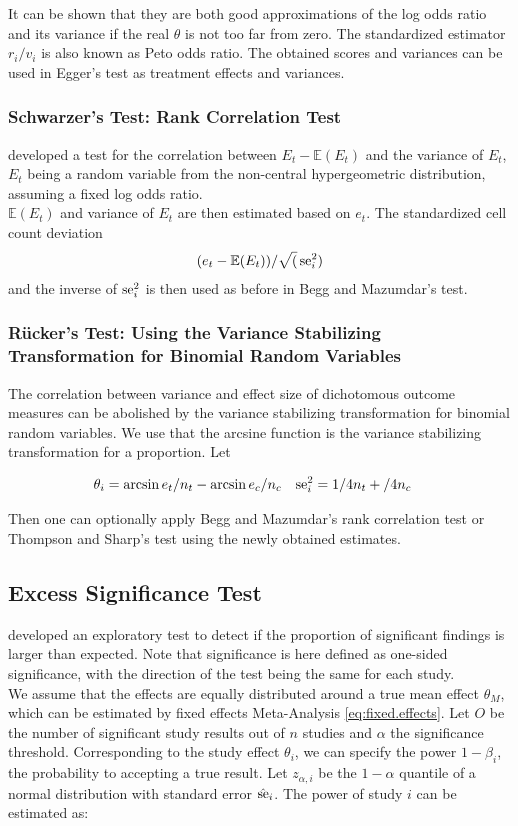 \documentclass[11pt,a4paper,twoside]{book}\usepackage[]{graphicx}\usepackage[]{color}
\begin{document}
It can be shown that they are both good approximations of the log odds ratio and its variance if the real $\theta$ is not too far from zero. The standardized estimator $r_i/v_i$ is also known as Peto odds ratio. The obtained scores and variances can be used in Egger's test as treatment effects and variances.


\subsubsection{Schwarzer's Test: Rank Correlation Test} \label{sec:Schwarzer}
\citet{Schwarzer} developed a test for the correlation between $E_t - \mathbb{E}(E_t)$ and the variance of $E_t$, $E_t$ being a random variable from the non-central hypergeometric distribution, assuming a fixed log odds ratio. \\
$\mathbb{E}(E_t)$ and variance of $E_t$ are then estimated based on $e_t$. The standardized cell count deviation 
\begin{align}
(e_t - \mathbb{E}(E_t))/\sqrt(\operatorname{se}_i^2)
\end{align}
and the inverse of $\operatorname{se}_i^2$ is then used as before in Begg and Mazumdar's test.

\subsubsection{R\"ucker's Test: Using the Variance Stabilizing Transformation for Binomial Random Variables} \label{sec:Rucker}
The correlation between variance and effect size of dichotomous outcome measures can be abolished by the variance stabilizing transformation for binomial random variables. We use that the arcsine function is the variance stabilizing transformation for a proportion. Let

\begin{align}
\theta_i &= \arcsin{e_t/n_t} - \arcsin{e_c/n_c} \nonumber &
\operatorname{se}_i^2 &= 1/4n_t + /4n_c \nonumber
\end{align}

Then one can optionally apply Begg and Mazumdar's rank correlation test or Thompson and Sharp's test using the newly obtained estimates.


\subsection{Excess Significance Test} \label{sec:excess.significance}
\citet{excess.significance} developed an exploratory test to detect if the proportion of significant findings is larger than expected. Note that significance is here defined as one-sided significance, with the direction of the test being the same for each study. \\
We assume that the effects are equally distributed around a true mean effect $\theta_M$, which can be estimated by fixed effects Meta-Analysis \ref{eq:fixed.effects}. Let $O$ be the number of significant study results out of $n$ studies and $\alpha$ the significance threshold. Corresponding to the study effect $\theta_i$, we can specify the power $1 - \beta_i$, the probability to accepting a true result. Let $z_{\alpha,i}$ be the $1-\alpha$ quantile of a normal distribution with standard error $\hat{\operatorname{se}}_i$. The power of study $i$ can be estimated as:
\end{document}
